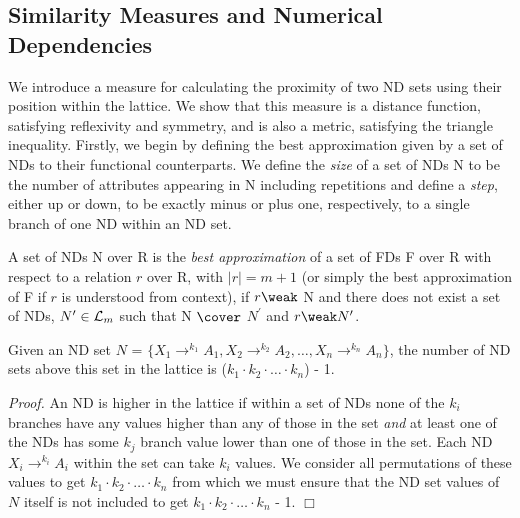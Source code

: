 \subsection{Similarity Measures and Numerical Dependencies}

We introduce a measure for calculating the proximity of two ND sets using
their position within the lattice.  We show that this measure is a distance
function, satisfying reflexivity and symmetry, and is also a metric, 
satisfying the triangle inequality. Firstly, we begin by defining the best
approximation given by a set of NDs to their functional counterparts.
We define the {\em size} of a set of NDs N to be the number of attributes 
appearing in N including repetitions and define a {\em step}, either up
or down, to be exactly minus or plus one, respectively, to a single branch of
one ND within an ND set. 

\begin{definition}\label{def:best}
\begin{rm}
A set of NDs N over R is the {\em best approximation} of 
a set of FDs F over R with respect to a relation $r$ over R,
with $\mid r \mid = m+1$ (or simply the best approximation of F
if $r$ is understood from context), if $r \weak$ N 
and there does not exist a set of NDs, $N^\prime \in {\cal L}_m$
such that N $\cover$ $N^\prime$ and $r \weak N^\prime$.
\end{rm}
\end{definition}



\begin{proposition}
\begin{rm}
Given an ND set $N$ = \linebreak[4]   $\{ X_1 \to^{k_1} A_1, X_2 \to^{k_2} A_2,
 \ldots, X_n \to^{k_n} A_n \}$, the number of ND sets above this set in the
lattice is ($k_1 \cdot k_2 \cdot \ldots \cdot k_n$) - 1.
\end{rm}
\end{proposition}

{\em Proof.} An ND is higher in the lattice if within a 
set of NDs none of the $k_i$ branches have any values higher than
any of those in the set {\em and} at least one of the NDs has some 
$k_j$ branch value
lower than one of those in the set. Each ND $X_i \to^{k_i} A_i$ within
the set can take $k_i$ values. We consider all permutations of these
values to get $k_1 \cdot k_2 \cdot \ldots \cdot k_n$ from which we 
must ensure that the ND set values of $N$ itself is not included to get
$k_1 \cdot k_2 \cdot \ldots \cdot k_n$ - 1. $\Box$

